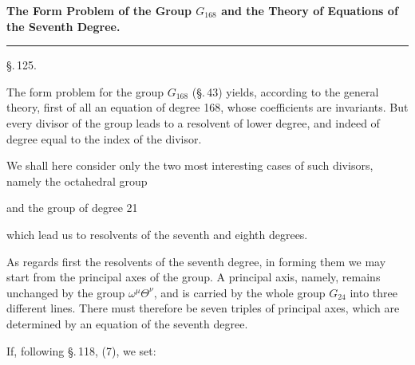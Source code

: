 
\begin{center}

\textbf{The Form Problem of the Group $G_{168}$ and the Theory of Equations of the Seventh Degree.}

\rule{4cm}{0.4pt}

\S.\,125.

\end{center}

The form problem for the group $G_{168}$ (\S.\,43) yields, according to the general theory, first of all an equation of degree 168, whose coefficients are invariants. But every divisor of the group leads to a resolvent of lower degree, and indeed of degree equal to the index of the divisor.

We shall here consider only the two most interesting cases of such divisors, namely the octahedral group


and the group of degree 21


which lead us to resolvents of the seventh and eighth degrees.

As regards first the resolvents of the seventh degree, in forming them we may start from the principal axes of the group. A principal axis, namely, remains unchanged by the group $\omega^\mu \Theta^\nu$, and is carried by the whole group $G_{24}$ into three different lines. There must therefore be seven triples of principal axes, which are determined by an equation of the seventh degree.

If, following \S.\,118, (7), we set:

